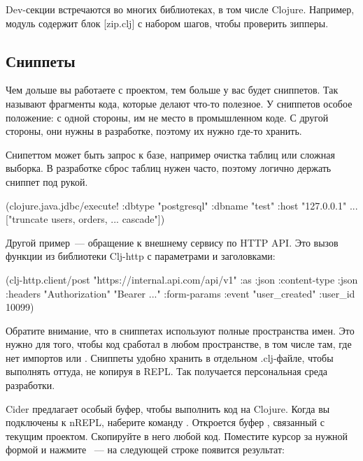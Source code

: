 Dev-секции встречаются во многих библиотеках, в том числе Clojure. Например, модуль  содержит блок [zip.clj] с набором шагов, чтобы проверить зипперы.

\subsection{Сниппеты}


Чем дольше вы работаете с проектом, тем больше у вас будет сниппетов. Так называют фрагменты кода, которые делают что-то полезное. У сниппетов особое положение: с одной стороны, им не место в промышленном коде. С другой стороны, они нужны в разработке, поэтому их нужно где-то хранить.

Снипеттом может быть запрос к базе, например очистка таблиц или сложная выборка. В разработке сброс таблиц нужен часто, поэтому логично держать сниппет под рукой.

\begin{english}
  \begin{clojure}
(clojure.java.jdbc/execute!
 {:dbtype "postgresql"
  :dbname "test"
  :host "127.0.0.1"
  ...}
 ["truncate users, orders, ... cascade"])
  \end{clojure}
\end{english}


Другой пример~--- обращение к внешнему сервису по HTTP API. Это вызов функции  из библиотеки Clj-http с параметрами и заголовками:

\begin{english}
  \begin{clojure}
(clj-http.client/post
 "https://internal.api.com/api/v1"
 {:as :json
  :content-type :json
  :headers {"Authorization" "Bearer ..."}
  :form-params {:event "user_created"
                :user_id 10099}})
  \end{clojure}
\end{english}

Обратите внимание, что в сниппетах используют полные пространства имен. Это нужно для того, чтобы код сработал в любом пространстве, в том числе там, где нет импортов  или . Сниппеты удобно хранить в отдельном .clj-файле, чтобы выполнять оттуда, не копируя в REPL. Так получается персональная среда разработки.

Cider предлагает особый буфер, чтобы выполнить код на Clojure. Когда вы подключены к nREPL, наберите команду . Откроется буфер , связанный с текущим проектом. Скопируйте в него любой код. Поместите курсор за нужной формой и нажмите ~--- на следующей строке появится результат:

